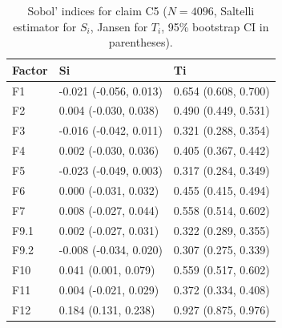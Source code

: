 \begin{table}[ht]
\centering
\caption{Sobol' indices for claim C5 ($N=4096$, Saltelli estimator for $S_i$, Jansen for $T_i$, 95\% bootstrap CI in parentheses).} 
\label{tab:sobol_C5}
\begin{tabular}{lll}
  \hline
Factor & Si & Ti \\ 
  \hline
F1 & -0.021 (-0.056, 0.013) & 0.654 (0.608, 0.700) \\ 
  F2 & 0.004 (-0.030, 0.038) & 0.490 (0.449, 0.531) \\ 
  F3 & -0.016 (-0.042, 0.011) & 0.321 (0.288, 0.354) \\ 
  F4 & 0.002 (-0.030, 0.036) & 0.405 (0.367, 0.442) \\ 
  F5 & -0.023 (-0.049, 0.003) & 0.317 (0.284, 0.349) \\ 
  F6 & 0.000 (-0.031, 0.032) & 0.455 (0.415, 0.494) \\ 
  F7 & 0.008 (-0.027, 0.044) & 0.558 (0.514, 0.602) \\ 
  F9.1 & 0.002 (-0.027, 0.031) & 0.322 (0.289, 0.355) \\ 
  F9.2 & -0.008 (-0.034, 0.020) & 0.307 (0.275, 0.339) \\ 
  F10 & 0.041 (0.001, 0.079) & 0.559 (0.517, 0.602) \\ 
  F11 & 0.004 (-0.021, 0.029) & 0.372 (0.334, 0.408) \\ 
  F12 & 0.184 (0.131, 0.238) & 0.927 (0.875, 0.976) \\ 
   \hline
\end{tabular}
\end{table}
